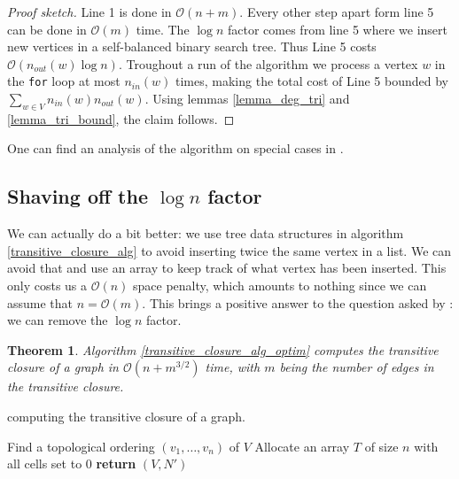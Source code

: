 \documentclass[11pt,a4paper]{article}
\newcommand{\BigO}{\mathcal O}
\newtheorem{Theo}{Theorem}
\theoremstyle{definition}
\begin{document}
\begin{proof}[Proof sketch]
Line 1 is done in $\BigO(n+m)$.
Every other step apart form line 5 can be done in $\BigO(m)$ time.
The $\log n$ factor comes from line 5 where we insert new
vertices in a self-balanced binary search tree. Thus Line 5
costs $\BigO(n_{out}(w)\log n)$. Troughout a run of 
the algorithm we process a vertex $w$ in the \texttt{for} loop at
most $n_{in}(w)$ times, making the total cost of
Line 5 bounded by $\sum_{w\in V}n_{in}(w)n_{out}(w)$. Using lemmas
\ref{lemma_deg_tri} and \ref{lemma_tri_bound}, the claim follows.
\end{proof}

One can find an analysis of the algorithm on special cases in 
\cite{HABIB1993289}.

\subsection{Shaving off the $\log n$ factor}
We can actually do a bit better: we use tree data structures
in algorithm \ref{transitive_closure_alg} to avoid
inserting twice the same vertex in a list. We can avoid that and
use an array to keep track of what vertex has been inserted.
This only costs us a $\BigO(n)$ space
penalty, which amounts to nothing since we can assume that $n=\BigO(m)$.
This brings a positive answer to the question asked by
\cite{borassi2015into}: we can remove the $\log n$ factor. 

\begin{Theo}
Algorithm \ref{transitive_closure_alg_optim} computes the transitive closure
of a graph in $\BigO(n+m^{3/2})$ time, with $m$ being the number of edges
in the transitive closure.
\end{Theo}

\begin{algorithm}
  \LinesNumbered
  \SetAlgoVlined
   
  \caption{computing the transitive closure of a graph.}
  \label{transitive_closure_alg_optim}

  Find a topological ordering $(v_1,\dots,v_n)$ of $V$\;
  Allocate an array $T$ of size $n$ with all cells set to $0$\;
  \textbf{return} $(V, N')$\;
\end{algorithm}
\end{document}
